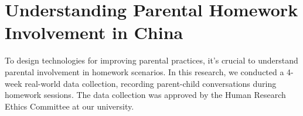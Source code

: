 \section{Understanding Parental Homework Involvement in China}

To design technologies for improving parental practices, it's crucial to understand parental involvement in homework scenarios. In this research, we conducted a 4-week real-world data collection, recording parent-child conversations during homework sessions. 
The data collection was approved by the Human Research Ethics Committee at our university.

